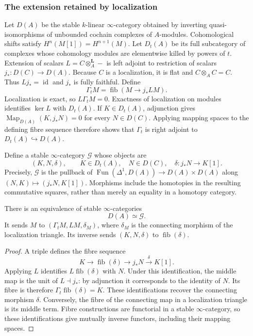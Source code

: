 \subsubsection{The extension retained by localization}

Let $D(A)$ be the stable $k$-linear $\infty$-category obtained by
inverting quasi-isomorphisms of unbounded cochain complexes of
$A$-modules. Cohomological shifts satisfy $H^n(M[1])=H^{n+1}(M)$.
Let $D_t(A)$ be its full subcategory of complexes whose cohomology
modules are elementwise killed by powers of $t$.
Extension of scalars $L=C\otimes_A^{\mathbf L}-$ is left adjoint
to restriction of scalars $j_*:D(C)\to D(A)$.
Because $C$ is a localization, it is flat and
$C\otimes_A C=C$. Thus $Lj_*=\operatorname{id}$ and $j_*$ is fully
faithful. Define
\[
 \Gamma_t M=\operatorname{fib}(M\longrightarrow j_*LM).
\]
Localization is exact, so $L\Gamma_tM=0$.
Exactness of localization on modules identifies $\ker L$ with
$D_t(A)$. If $K\in D_t(A)$, adjunction gives
$\operatorname{Map}_{D(A)}(K,j_*N)=0$ for every $N\in D(C)$.
Applying mapping spaces to the defining fibre sequence therefore
shows that $\Gamma_t$ is right adjoint to $D_t(A)\hookrightarrow D(A)$.

Define a stable $\infty$-category $\mathcal G$ whose objects are
\[
 (K,N,\delta),\qquad K\in D_t(A),\quad N\in D(C),\quad
 \delta:j_*N\longrightarrow K[1].
\]
Precisely, $\mathcal G$ is the pullback of
$\operatorname{Fun}(\Delta^1,D(A))\to D(A)\times D(A)$ along
$(N,K)\mapsto(j_*N,K[1])$.
Morphisms include the homotopies in the resulting commutative
squares, rather than merely an equality in a homotopy category.

\begin{proposition}
\label{v4-arith:w5-h:localization-gluing}
There is an equivalence of stable $\infty$-categories
\[
 D(A)\simeq\mathcal G.
\]
It sends $M$ to $(\Gamma_tM,LM,\delta_M)$, where $\delta_M$ is the
connecting morphism of the localization triangle.
Its inverse sends $(K,N,\delta)$ to $\operatorname{fib}(\delta)$.
\end{proposition}
\begin{proof}
A triple defines the fibre sequence
\[
 K\longrightarrow \operatorname{fib}(\delta)
 \longrightarrow j_*N\xrightarrow{\delta}K[1].
\]
Applying $L$ identifies $L\operatorname{fib}(\delta)$ with $N$.
Under this identification, the middle map is the unit of $L\dashv j_*$:
by adjunction it corresponds to the identity of $N$.
Its fibre is therefore $\Gamma_t\operatorname{fib}(\delta)=K$.
These identifications recover the connecting morphism $\delta$.
Conversely, the fibre of the connecting map in a localization
triangle is its middle term. Fibre constructions are functorial
in a stable $\infty$-category, so these identifications give mutually
inverse functors, including their mapping spaces.
\end{proof}


